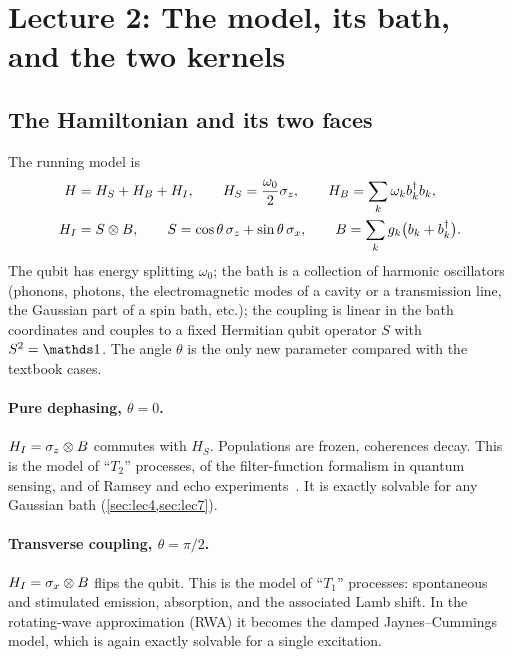 \section{Lecture 2: The model, its bath, and the two kernels}
\label{sec:lec2}

\subsection{The Hamiltonian and its two faces}

The running model is
\begin{equation}
\begin{aligned}
  H&=H_S+H_B+H_I,\qquad
  H_S=\frac{\omega_0}{2}\sigma_z,\qquad
  H_B=\sum_k\omega_kb_k^\dagger b_k,\\
  H_I&=S\otimes B,\qquad
  S=\cos\theta\,\sigma_z+\sin\theta\,\sigma_x,\qquad
  B=\sum_kg_k\big(b_k+b_k^\dagger\big).
\end{aligned}
  \label{eq:model}
\end{equation}
The qubit has energy splitting $\omega_0$; the bath is a collection of harmonic oscillators (phonons, photons, the electromagnetic modes of a cavity or a transmission line, the Gaussian part of a spin bath, etc.); the coupling is linear in the bath coordinates and couples to a fixed Hermitian qubit operator $S$ with $S^2=\Id$.
The angle $\theta$ is the only new parameter compared with the textbook cases.

\paragraph{Pure dephasing, $\theta=0$.}
$H_I=\sigma_z\otimes B$ commutes with $H_S$.
Populations are frozen, coherences decay.
This is the model of ``$T_2$'' processes, of the filter-function formalism in quantum sensing, and of Ramsey and echo experiments~\cite{Ramsey1950,Hahn1950}.
It is exactly solvable for any Gaussian bath (\cref{sec:lec4,sec:lec7}).

\paragraph{Transverse coupling, $\theta=\pi/2$.}
$H_I=\sigma_x\otimes B$ flips the qubit.
This is the model of ``$T_1$'' processes: spontaneous and stimulated emission, absorption, and the associated Lamb shift.
In the rotating-wave approximation (RWA) it becomes the damped Jaynes--Cummings model, which is again exactly solvable for a single excitation.


